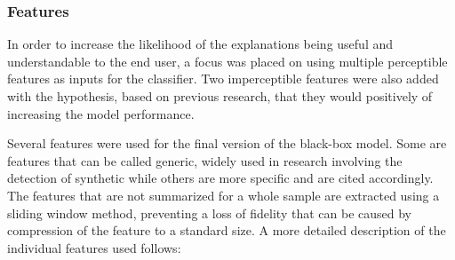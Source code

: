 \documentclass{article}
\begin{document}
			\subsubsection{Features}
			In order to increase the likelihood of the explanations being useful and
			understandable to the end user, a focus was placed on using multiple perceptible
			features as inputs for the classifier. Two imperceptible features were also added with
			the hypothesis, based on previous research, that they would positively of increasing
			the model performance.
			\par
			Several features were used for the final version of the black-box model. Some are
			features that can be called generic, widely used in research involving the detection
			of synthetic while others are more specific and are cited accordingly. The features
			that are not summarized for a whole sample are extracted using a sliding window method,
			preventing a loss of fidelity that can be caused by compression of the feature to a
			standard size. A more detailed description of the individual features used follows:
\end{document}
